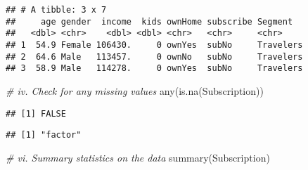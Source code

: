 \documentclass[
]{article}
\newenvironment{Shaded}{\begin{snugshade}}{\end{snugshade}}
\newcommand{\CommentTok}[1]{\textcolor[rgb]{0.56,0.35,0.01}{\textit{#1}}}
\newcommand{\FunctionTok}[1]{\textcolor[rgb]{0.00,0.00,0.00}{#1}}
\newcommand{\NormalTok}[1]{#1}
\newcommand{\OtherTok}[1]{\textcolor[rgb]{0.56,0.35,0.01}{#1}}
\newcommand{\SpecialCharTok}[1]{\textcolor[rgb]{0.00,0.00,0.00}{#1}}
\begin{document}
\begin{verbatim}
## # A tibble: 3 x 7
##     age gender  income  kids ownHome subscribe Segment  
##   <dbl> <chr>    <dbl> <dbl> <chr>   <chr>     <chr>    
## 1  54.9 Female 106430.     0 ownYes  subNo     Travelers
## 2  64.6 Male   113457.     0 ownNo   subNo     Travelers
## 3  58.9 Male   114278.     0 ownYes  subNo     Travelers
\end{verbatim}

\begin{Shaded}
\begin{Highlighting}[]
\CommentTok{\# iv. Check for any missing values}
\FunctionTok{any}\NormalTok{(}\FunctionTok{is.na}\NormalTok{(Subscription))}
\end{Highlighting}
\end{Shaded}

\begin{verbatim}
## [1] FALSE
\end{verbatim}

\begin{Shaded}
\end{Shaded}

\begin{verbatim}
## [1] "factor"
\end{verbatim}

\begin{Shaded}
\begin{Highlighting}[]
\CommentTok{\# vi. Summary statistics on the data}
\FunctionTok{summary}\NormalTok{(Subscription)}
\end{Highlighting}
\end{Shaded}
\end{document}
